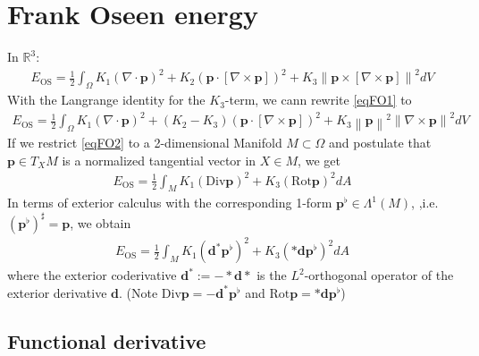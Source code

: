\documentclass{scrartcl}
\newcommand{\exd}{\mathbf{d}}
\newcommand{\excod}{\exd^{*}} %
\newcommand{\Div}{\text{Div}}
\newcommand{\Rot}{\text{Rot}}
\newcommand{\R}{\mathds{R}}
\newcommand{\M}{M}
\newcommand{\dA}{dA}
\newcommand{\p}{\mathbf{p}}
\newcommand{\pfl}{\mathbf{p}^{\flat}}
\newcommand{\EOS}{E_{\text{OS}}}
\begin{document}
\tableofcontents

\section{Frank Oseen energy}

In \( \R^{3} \):
\begin{align}\label{eqFO1}
  \EOS = \frac{1}{2}\int_{\Omega} K_{1}\left( \nabla\cdot\p \right)^{2} 
                        + K_{2}\left( \p\cdot\left[ \nabla\times\p \right] \right)^{2}
                        + K_{3}\left\| \p\times\left[ \nabla\times\p \right] \right\|^{2} dV
\end{align}
With the Langrange identity for the \( K_{3} \)-term, we cann rewrite \eqref{eqFO1} to
\begin{align}\label{eqFO2}
  \EOS = \frac{1}{2}\int_{\Omega} K_{1}\left( \nabla\cdot\p \right)^{2} 
                        + (K_{2}-K_{3})\left( \p\cdot\left[ \nabla\times\p \right] \right)^{2}
                        + K_{3}\left\| \p \right\|^{2}\left\| \nabla\times\p \right\|^{2} dV
\end{align}
If we restrict \eqref{eqFO2} to a 2-dimensional Manifold \( \M\subset\Omega \) 
and postulate that \( \p\in T_{X}\M \) is a normalized tangential vector in \( X\in\M \), we get
\begin{align}
  \EOS = \frac{1}{2} \int_{\M} K_{1}\left( \Div\p \right)^{2} + K_{3}\left( \Rot \p \right)^{2} \dA 
\end{align}
In terms of exterior calculus with the corresponding 1-form \( \pfl\in\Lambda^{1}(M) \), 
,i.e. \( \left( \pfl \right)^{\sharp} = \p\), we obtain
\begin{align}
  \EOS = \frac{1}{2} \int_{\M} K_{1}\left( \excod\pfl \right)^{2} + K_{3}\left( *\exd \pfl \right)^{2} \dA
\end{align}
where the exterior coderivative \( \excod := -* \exd * \) is the \( L^{2} \)-orthogonal operator of the exterior derivative \( \exd \). 
(Note \( \Div\p = -\excod\pfl \) and \( \Rot\p = *\exd\pfl \)) 

  \subsection{Functional derivative}
  
\end{document}
